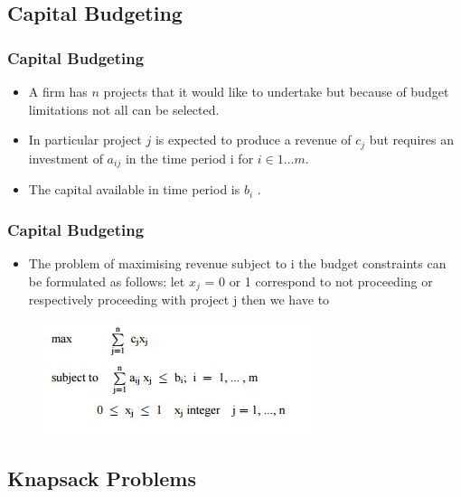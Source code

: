 \documentclass{beamer}
\begin{document}
\subsection{Capital Budgeting}
\begin{frame}
\frametitle{Capital Budgeting}
\Large
\begin{itemize}
\item	A firm has $n$ projects that it would like to undertake but because of budget limitations not all can be
	selected. 
\item In particular project $j$ is expected to produce a revenue of $c_j$ but requires an investment of $a_{ij}$ in the time period i for $i \in 1 \ldots m$. 
\item The capital available in time period  is $b_i$ . 
\end{itemize}
\end{frame}
\begin{frame}
	\frametitle{Capital Budgeting}
	\Large
	\begin{itemize}
		\item The problem of maximising revenue subject to i
	the budget constraints can be formulated as follows: let $x_j$ = 0 or 1 correspond to not proceeding or 	respectively proceeding with project j then we have to
\end{itemize}
\begin{figure}
\centering
\includegraphics[width=0.7\linewidth]{capitalbudgeting}
\end{figure}

\end{frame}
\subsection{Knapsack Problems}
\end{document}
